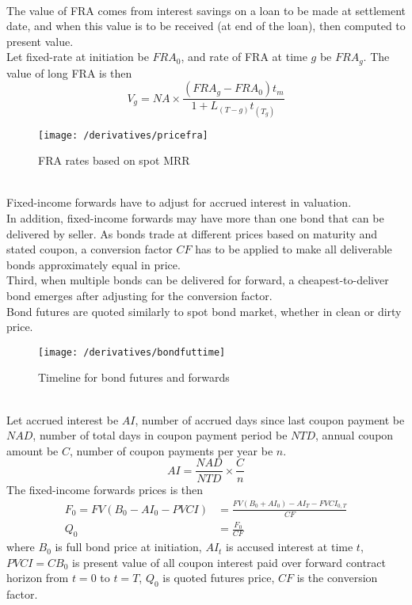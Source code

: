 \begin{method} \\
The value of FRA comes from interest savings on a loan to be made at settlement date, and when this value is to be received (at end of the loan), then computed to present value.\\
Let fixed-rate at initiation be $FRA_0$, and rate of FRA at time $g$ be $FRA_g$. The value of long FRA is then
\begin{equation}
V_g = NA \times \frac{(FRA_g - FRA_0)t_m}{1 + L_{(T-g)} t_{(T_g)}} \nonumber
\end{equation}
\end{method}

\begin{figure}[H]
\centering
\texttt{[image: /derivatives/pricefra]}
\caption{FRA rates based on spot MRR}
\end{figure}

\begin{remark} \\
Fixed-income forwards have to adjust for accrued interest in valuation.\\
In addition, fixed-income forwards may have more than one bond that can be delivered by seller. As bonds trade at different prices based on maturity and stated coupon, a conversion factor $CF$ has to be applied to make all deliverable bonds approximately equal in price.\\
Third, when multiple bonds can be delivered for forward, a cheapest-to-deliver bond emerges after adjusting for the conversion factor.\\
Bond futures are quoted similarly to spot bond market, whether in clean or dirty price.
\end{remark}

\begin{figure}[H]
\centering
\texttt{[image: /derivatives/bondfuttime]}
\caption{Timeline for bond futures and forwards}
\end{figure}

\begin{method} \\
Let accrued interest be $AI$, number of accrued days since last coupon payment be $NAD$, number of total days in coupon payment period be $NTD$, annual coupon amount be $C$, number of coupon payments per year be $n$.
\begin{equation}
AI = \frac{NAD}{NTD} \times \frac{C}{n} \nonumber
\end{equation}
The fixed-income forwards prices is then
\begin{align}
F_0 = FV(B_0 - AI_0 - PVCI) &= \frac{FV(B_0+AI_0) - AI_T - FVCI_{0,T}}{CF} \nonumber \\
Q_0 &= \frac{F_0}{CF} \nonumber
\end{align}
where $B_0$ is full bond price at initiation, $AI_t$ is accused interest at time $t$, $PVCI = CB_0$ is present value of all coupon interest paid over forward contract horizon from $t = 0$ to $t = T$, $Q_0$ is quoted futures price, $CF$ is the conversion factor.
\end{method}

